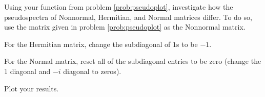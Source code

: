 \begin{problem}
Using your function from problem \ref{prob:pseudoplot}, investigate how the pseudospectra of Nonnormal, Hermitian, and Normal matrices differ.  To do so, use the matrix given in problem \ref{prob:pseudoplot} as the Nonnormal matrix.  

For the Hermitian matrix, change the subdiagonal of $1$s to be $-1$.  

For the Normal matrix, reset all of the subdiagonal entries to be zero (change the $1$ diagonal and $-i$ diagonal to zeros).

Plot your results.
\end{problem} 


